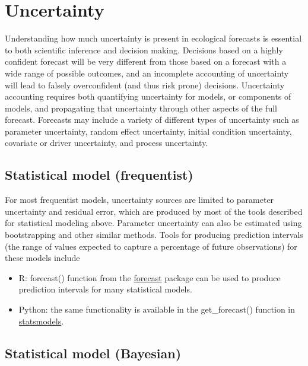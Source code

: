 \documentclass[
]{book}
\begin{document}
\hypertarget{uncertainty}{%
\section{Uncertainty}\label{uncertainty}}

Understanding how much uncertainty is present in ecological forecasts is essential to both scientific inference and decision making. Decisions based on a highly confident forecast will be very different from those based on a forecast with a wide range of possible outcomes, and an incomplete accounting of uncertainty will lead to falsely overconfident (and thus risk prone) decisions. Uncertainty accounting requires both quantifying uncertainty for models, or components of models, and propagating that uncertainty through other aspects of the full forecast. Forecasts may include a variety of different types of uncertainty such as parameter uncertainty, random effect uncertainty, initial condition uncertainty, covariate or driver uncertainty, and process uncertainty.

\hypertarget{statistical-model-frequentist-1}{%
\subsection{Statistical model (frequentist)}\label{statistical-model-frequentist-1}}

For most frequentist models, uncertainty sources are limited to parameter uncertainty and residual error, which are produced by most of the tools described for statistical modeling above. Parameter uncertainty can also be estimated using bootstrapping and other similar methods. Tools for producing prediction intervals (the range of values expected to capture a percentage of future observations) for these models include

\begin{itemize}
\item
  R: forecast() function from the \href{https://cran.r-project.org/web/packages/forecast/index.html}{forecast} package can be used to produce prediction intervals for many statistical models.
\item
  Python: the same functionality is available in the get\_forecast() function in \href{https://www.statsmodels.org/stable/index.html}{statsmodels}.
\end{itemize}

\hypertarget{statistical-model-bayesian-1}{%
\subsection{Statistical model (Bayesian)}\label{statistical-model-bayesian-1}}
\end{document}
